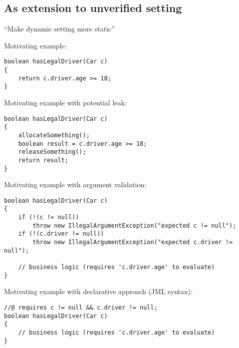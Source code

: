 
\subsection{As extension to unverified setting}
“Make dynamic setting more static”


Motivating example:
\begin{lstlisting}
boolean hasLegalDriver(Car c)
{
    return c.driver.age >= 18;
}
\end{lstlisting}

Motivating example with potential leak:
\begin{lstlisting}
boolean hasLegalDriver(Car c)
{
    allocateSomething();
    boolean result = c.driver.age >= 18;
    releaseSomething();
    return result;
}
\end{lstlisting}

Motivating example with argument validation:
\begin{lstlisting}
boolean hasLegalDriver(Car c)
{
    if (!(c != null))
        throw new IllegalArgumentException("expected c != null");
    if (!(c.driver != null))
        throw new IllegalArgumentException("expected c.driver != null");
        
    // business logic (requires 'c.driver.age' to evaluate)
}
\end{lstlisting}

Motivating example with declarative approach (JML syntax):
\begin{lstlisting}
//@ requires c != null && c.driver != null;
boolean hasLegalDriver(Car c)
{
    // business logic (requires 'c.driver.age' to evaluate)
}
\end{lstlisting}

